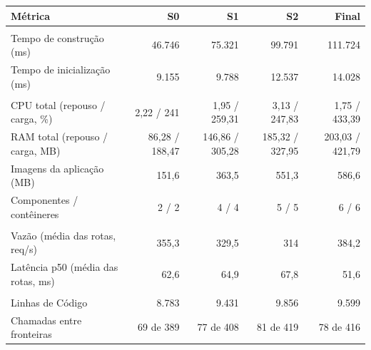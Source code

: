 \begin{quadro}[htb]
  \centering
  \caption{Inventário --- métricas por snapshot --- Transações.}
  \label{qua:comp_inventory-api_transacoes_snapshots}
  \renewcommand{\arraystretch}{1.15}
  \begin{tabularx}{\textwidth}{|>{\raggedright\arraybackslash}X|r|r|r|r|}
    \hline
    \textbf{Métrica} & \textbf{S0} & \textbf{S1} & \textbf{S2} & \textbf{Final} \\
    \hline
    \multicolumn{5}{|l|}{\textbf{Agilidade}} \\
    \hline
    Tempo de construção (ms) & 46.746 & 75.321 & 99.791 & 111.724 \\
    Tempo de inicialização (ms) & 9.155 & 9.788 & 12.537 & 14.028 \\
    \hline
    \multicolumn{5}{|l|}{\textbf{Custo}} \\
    \hline
    CPU total (repouso / carga, \%) & 2,22 / 241 & 1,95 / 259,31 & 3,13 / 247,83 & 1,75 / 433,39 \\
    RAM total (repouso / carga, MB) & 86,28 / 188,47 & 146,86 / 305,28 & 185,32 / 327,95 & 203,03 / 421,79 \\
    Imagens da aplicação (MB) & 151,6 & 363,5 & 551,3 & 586,6 \\
    Componentes / contêineres & 2 / 2 & 4 / 4 & 5 / 5 & 6 / 6 \\
    \hline
    \multicolumn{5}{|l|}{\textbf{Desempenho}} \\
    \hline
    Vazão (média das rotas, req/s) & 355,3 & 329,5 & 314 & 384,2 \\
    Latência p50 (média das rotas, ms) & 62,6 & 64,9 & 67,8 & 51,6 \\
    \hline
    \multicolumn{5}{|l|}{\textbf{Manutenibilidade}} \\
    \hline
    Linhas de Código & 8.783 & 9.431 & 9.856 & 9.599 \\
    Chamadas entre fronteiras & 69 de 389 & 77 de 408 & 81 de 419 & 78 de 416 \\
    \hline
  \end{tabularx}
\end{quadro}
